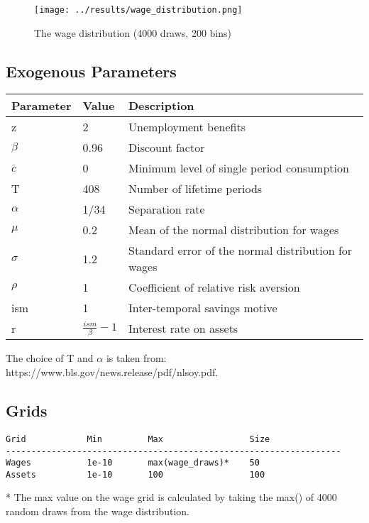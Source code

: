 \documentclass[12pt]{article}
\begin{document}
\begin{figure}[hbt!]
\centering
\texttt{[image: ../results/wage\_distribution.png]}
\caption{The wage distribution (4000 draws, 200 bins)}
\label{fig:wage_distribution}
\end{figure}

\subsection{Exogenous Parameters}


\begin{tabular}{ |l l l| }
 \hline
 Parameter &  Value & Description \\ [0.5ex]
 \hline
 z & 2 & Unemployment benefits \\
$\beta$ & 0.96 & Discount factor \\
$\overline{c}$ & 0 & Minimum level of single period consumption \\
T & 408 & Number of lifetime periods \\
$\alpha$ & 1/34 & Separation rate \\
$\mu$ & 0.2 & Mean of the normal distribution for wages \\
$\sigma$ & 1.2 & Standard error of the normal distribution for wages \\
$\rho$ & 1 & Coefficient of relative risk aversion \\
ism & 1 & Inter-temporal savings motive \\
r & $\frac{ism}{\beta} - 1$ & Interest rate on assets \\ [1ex]
 \hline
\end{tabular}

\vspace{5mm}
The choice of T and $\alpha$ is taken from: https://www.bls.gov/news.release/pdf/nlsoy.pdf.

\subsection{Grids}
\begin{Verbatim}[frame = single, fontsize = \footnotesize]
Grid            Min         Max                 Size
------------------------------------------------------------------
Wages           1e-10       max(wage_draws)*    50
Assets          1e-10       100                 100
\end{Verbatim}

* The max value on the wage grid is calculated by taking the max() of 4000 random draws from the wage distribution.
\end{document}
